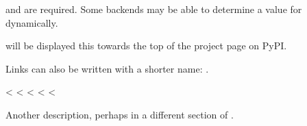 \documentclass[letterpaper,10pt,english]{sphinxmanual}
\begin{document}
{\hyperref[\detokenize{index:tconf-project.name}]{}} and {\hyperref[\detokenize{index:tconf-project.version}]{}} are required.
Some backends may be able to determine a value for {\hyperref[\detokenize{index:tconf-project.version}]{}} dynamically.

{\hyperref[\detokenize{index:tconf-description}]{}} will be displayed this towards the top of the project page on PyPI.

Links can also be written with a shorter name: {\hyperref[\detokenize{index:tconf-project.name}]{}}.


\begin{fulllineitems}
<%
\pysigstartsignatures
<%
<%
<%
\pysigstopsignatures<%
\vspace{-45px}

\begin{DUlineblock}{0em}
\item[]  
\item[]  
\item[]  
\end{DUlineblock}

\vspace{-25px}

Another description, perhaps in a different section of .

\end{fulllineitems}

\end{document}
